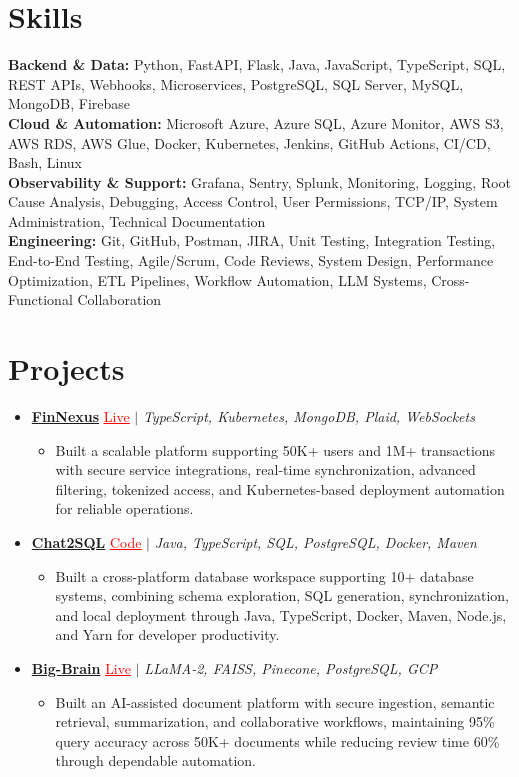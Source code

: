 \documentclass[letterpaper,10pt]{article}
\newcommand{\itemTail}{\vspace{-5pt}}
\newcommand{\sectionGap}{\vspace{-8pt}}
\newcommand{\projGap}{\vspace{3pt}}
\newcommand{\resumeItem}[1]{\item\small{{#1 \itemTail}}}
\newcommand{\resumeProjectHeading}[1]{\item \small #1 \vspace{-2pt}}
\newcommand{\resumeProjectLink}[2]{\href{#1}{\textcolor{red}{\underline{#2}}}}
\newcommand{\resumeSubHeadingListStart}{\begin{itemize}[leftmargin=0.0in, label={}]}
\newcommand{\resumeSubHeadingListEnd}{\end{itemize}}
\newcommand{\resumeProjItemListStart}{\begin{itemize}[leftmargin=0.15in,label=\textbullet,itemsep=3pt,topsep=0pt,parsep=0pt,partopsep=0pt]}
\newcommand{\resumeProjItemListEnd}{\end{itemize}\vspace{-4pt}}
\begin{document}
\section{Skills}
\begin{itemize}[leftmargin=0.15in, label={}]
\footnotesize{\item{
\textbf{Backend \& Data:} Python, FastAPI, Flask, Java, JavaScript, TypeScript, SQL, REST APIs, Webhooks, Microservices, PostgreSQL, SQL Server, MySQL, MongoDB, Firebase \\
\textbf{Cloud \& Automation:} Microsoft Azure, Azure SQL, Azure Monitor, AWS S3, AWS RDS, AWS Glue, Docker, Kubernetes, Jenkins, GitHub Actions, CI/CD, Bash, Linux \\
\textbf{Observability \& Support:} Grafana, Sentry, Splunk, Monitoring, Logging, Root Cause Analysis, Debugging, Access Control, User Permissions, TCP/IP, System Administration, Technical Documentation \\
\textbf{Engineering:} Git, GitHub, Postman, JIRA, Unit Testing, Integration Testing, End-to-End Testing, Agile/Scrum, Code Reviews, System Design, Performance Optimization, ETL Pipelines, Workflow Automation, LLM Systems, Cross-Functional Collaboration
}}
\end{itemize}
\sectionGap
\section{Projects}
\resumeSubHeadingListStart
\vspace{-2pt}
\resumeProjectHeading{\href{https://fin-nexus.vercel.app/}{\textbf{FinNexus}} \resumeProjectLink{https://fin-nexus.vercel.app/}{Live} $|$ \emph{TypeScript, Kubernetes, MongoDB, Plaid, WebSockets}}
\resumeProjItemListStart
\resumeItem{Built a scalable platform supporting 50K+ users and 1M+ transactions with secure service integrations, real-time synchronization, advanced filtering, tokenized access, and Kubernetes-based deployment automation for reliable operations.}
\resumeProjItemListEnd
\projGap
\resumeProjectHeading{\href{https://github.com/SAHAJ-BHADJA/Chat2SQL}{\textbf{Chat2SQL}} \resumeProjectLink{https://github.com/SAHAJ-BHADJA/Chat2SQL}{Code} $|$ \emph{Java, TypeScript, SQL, PostgreSQL, Docker, Maven}}
\resumeProjItemListStart
\resumeItem{Built a cross-platform database workspace supporting 10+ database systems, combining schema exploration, SQL generation, synchronization, and local deployment through Java, TypeScript, Docker, Maven, Node.js, and Yarn for developer productivity.}
\resumeProjItemListEnd
\projGap
\resumeProjectHeading{\href{https://big-brain-pied.vercel.app/}{\textbf{Big-Brain}} \resumeProjectLink{https://big-brain-pied.vercel.app/}{Live} $|$ \emph{LLaMA-2, FAISS, Pinecone, PostgreSQL, GCP}}
\resumeProjItemListStart
\resumeItem{Built an AI-assisted document platform with secure ingestion, semantic retrieval, summarization, and collaborative workflows, maintaining 95\% query accuracy across 50K+ documents while reducing review time 60\% through dependable automation.}
\resumeProjItemListEnd
\resumeSubHeadingListEnd
\end{document}
